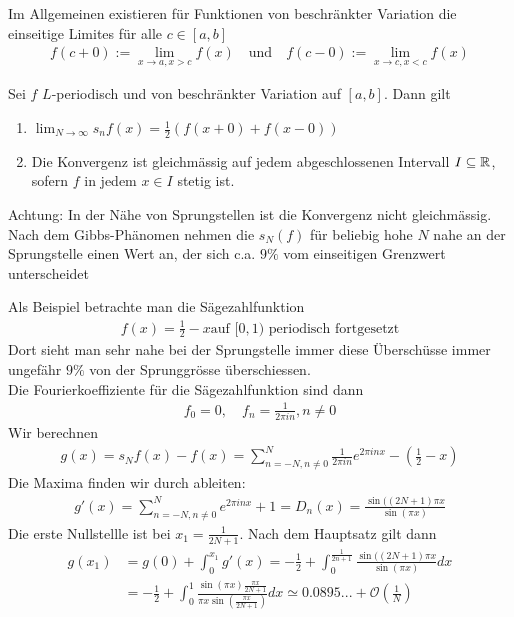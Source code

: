 Im Allgemeinen existieren für Funktionen von beschränkter Variation die einseitige Limites für alle $c \in [a,b]$
\begin{align*}
	f(c + 0) := \lim_{x \to a, x > c} f(x) \quad \text{und} \quad f(c-0) := \lim_{x \to c, x < c} f(x)
\end{align*}

\begin{satz}[]
	Sei $f$ $L$-periodisch und von beschränkter Variation auf $[a,b]$. Dann gilt 
	\begin{enumerate}
		\item $\lim_{N \to \infty} s_nf(x) = \frac{1}{2} \left(f(x+0) + f(x - 0)\right)$
		\item Die Konvergenz ist gleichmässig auf jedem abgeschlossenen Intervall $I \subseteq \mathbb{R}$, sofern $f$ in jedem $x \in I$ stetig ist.
	\end{enumerate}
\end{satz}

\begin{nlemma}
Achtung: In der Nähe von Sprungstellen ist die Konvergenz nicht gleichmässig.\\
Nach dem Gibbs-Phänomen nehmen die $s_N(f)$ für beliebig hohe $N$ nahe an der Sprungstelle einen Wert an, der sich c.a. $9\%$ vom einseitigen Grenzwert unterscheidet
\end{nlemma}

Als Beispiel betrachte man die Sägezahlfunktion
\begin{align*}
	f(x) = \frac{1}{2} - x \text{auf } [0,1) \text{ periodisch fortgesetzt}
\end{align*}
Dort sieht man sehr nahe bei der Sprungstelle immer diese Überschüsse immer ungefähr $9\%$ von der Sprunggrösse überschiessen.\\

Die Fourierkoeffiziente für die Sägezahlfunktion sind dann
\begin{align*}
f_0 = 0, \quad f_n = \frac{1}{2\pi in}, n \neq 0
\end{align*}
Wir berechnen
\begin{align*}
	g(x) = s_Nf(x) - f(x) = \sum_{n = -N, n \neq 0}^{N} \frac{1}{2\pi i n} e^{2\pi in x} - (\frac{1}{2} - x)
\end{align*}
Die Maxima finden wir durch ableiten:
\begin{align*}
	g'(x) = \sum_{n = -N, n \neq 0}^{N} e^{2\pi i n x} + 1 = D_n(x) = \frac{\sin((2N + 1) \pi x}{\sin(\pi x)}
\end{align*}
Die erste Nullstellle ist bei $x_1 = \frac{1}{2N + 1}$. Nach dem Hauptsatz gilt dann
\begin{align*}
	g(x_1) &= g(0) + \int_{0}^{x_1} g'(x) = - \frac{1}{2} + \int_{0}^{\frac{1}{2n + 1}} \frac{\sin((2N + 1) \pi x}{\sin(\pi x)} dx\\
				 &= -\frac{1}{2} + \int_{0}^{1} \frac{\sin(\pi x) \frac{\pi x}{2N + 1}}{\pi x \sin \left(\frac{\pi x}{2N + 1}\right)} dx \simeq 0.0895... + \mathcal{O}(\frac{1}{N})
\end{align*}


